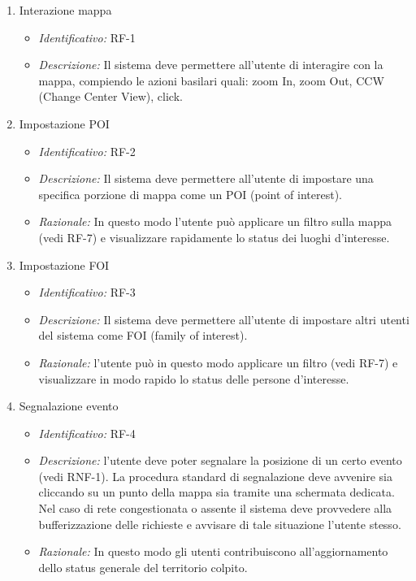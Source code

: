\begin{enumerate}
\item Interazione mappa
  \begin{itemize}
     \item\textit{Identificativo:} RF-1
  \item\textit{Descrizione:} Il sistema deve permettere all’utente di interagire con la mappa, compiendo le azioni basilari quali: zoom In, zoom Out, CCW (Change Center View), click.
  \end{itemize}
  \newpage
\item Impostazione POI
  \begin{itemize}
  \item\textit{Identificativo:} RF-2
  \item\textit{Descrizione:} Il sistema deve permettere all’utente di impostare una specifica porzione di mappa come un POI (point of interest).
  \item\textit{Razionale:} In questo modo l’utente può applicare un filtro sulla mappa (vedi RF-7)  e visualizzare rapidamente lo status dei luoghi d’interesse.
  \end{itemize}
  
\item Impostazione FOI
  \begin{itemize}
  \item\textit{Identificativo:} RF-3
  \item\textit{Descrizione:} Il sistema deve permettere all’utente di impostare altri utenti del sistema come FOI (family of interest).
  \item\textit{Razionale:} l’utente può in questo modo applicare un filtro (vedi RF-7) e visualizzare in modo rapido lo status delle persone d’interesse.
  \end{itemize}
  
  \item Segnalazione evento
  \begin{itemize}
  \item\textit{Identificativo:} RF-4
  \item\textit{Descrizione:} l’utente deve poter segnalare la posizione di un certo evento (vedi RNF-1). 
La procedura standard di segnalazione deve avvenire sia cliccando su un punto della mappa sia tramite una schermata dedicata.
Nel caso di rete congestionata o assente il sistema deve provvedere alla bufferizzazione delle richieste e avvisare di tale situazione l’utente stesso.
  \item\textit{Razionale:} In questo modo gli utenti contribuiscono all’aggiornamento dello status generale del territorio colpito.
  \end{itemize}
  

\end{enumerate}
